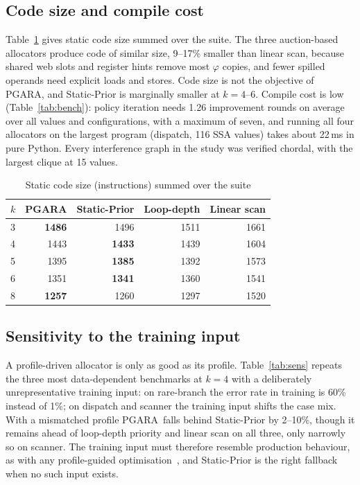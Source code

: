 \documentclass[conference]{IEEEtran}
\newcommand{\MG}{PGARA}
\begin{document}
\subsection{Code size and compile cost}

Table~\ref{tab:size} gives static code size summed over the suite.
The three auction-based allocators produce code of similar size,
9--17\% smaller than linear scan, because shared web slots and register
hints remove most $\varphi$ copies, and fewer spilled operands need
explicit loads and stores. Code size is not the objective of \MG, and
Static-Prior is marginally smaller at $k=4$--6. Compile cost is low
(Table~\ref{tab:bench}): policy iteration needs 1.26 improvement rounds
on average over all values and configurations, with a maximum of seven,
and running all four allocators on the largest program (dispatch, 116 SSA values) takes
about 22\,ms in pure Python. Every interference graph in the study was
verified chordal, with the largest clique at 15 values.

\begin{table}[t]
\centering
\caption{Static code size (instructions) summed over the suite}
\label{tab:size}
\footnotesize
\begin{tabular}{@{}lrrrr@{}}
\toprule
$k$ & \MG & Static-Prior & Loop-depth & Linear scan \\
\midrule
3 & \textbf{1486} & 1496 & 1511 & 1661 \\
4 & 1443 & \textbf{1433} & 1439 & 1604 \\
5 & 1395 & \textbf{1385} & 1392 & 1573 \\
6 & 1351 & \textbf{1341} & 1360 & 1541 \\
8 & \textbf{1257} & 1260 & 1297 & 1520 \\
\bottomrule
\end{tabular}
\end{table}

\subsection{Sensitivity to the training input}

A profile-driven allocator is only as good as its profile. Table~\ref{tab:sens}
repeats the three most data-dependent benchmarks at $k=4$ with a
deliberately unrepresentative training input: on rare-branch the error
rate in training is 60\% instead of 1\%; on dispatch and scanner the
training input shifts the case mix. With a mismatched profile \MG\
falls behind Static-Prior by 2--10\%, though it remains ahead of
loop-depth priority and linear scan on all three, only narrowly so on
scanner. The training input must
therefore resemble production behaviour, as with any profile-guided
optimisation~\cite{panchenko2019bolt,wagner1994}, and Static-Prior is
the right fallback when no such input exists.
\end{document}
